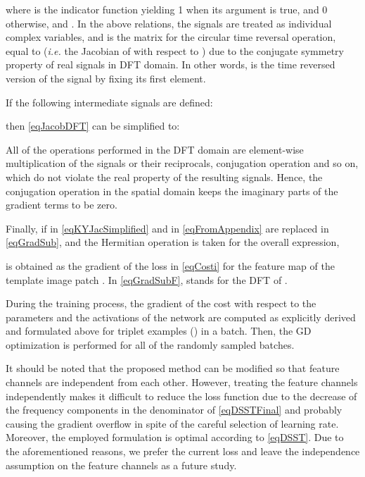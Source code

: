 \documentclass[journal]{IEEEtran}
\begin{document}
\normalsize
where  is the indicator function yielding 1 when its argument is true, and 0 otherwise, and . In the above relations, the signals are treated as individual complex variables, and  is the matrix for the circular time reversal operation, equal to  (\emph{i.e.} the Jacobian of  with respect to ) due to the conjugate symmetry property of real signals in DFT domain. In other words,  is the time reversed version of the signal  by fixing its first element.

If the following intermediate signals are defined:

then \eqref{eqJacobDFT} can be simplified to:


All of the operations performed in the DFT domain are element-wise multiplication of the signals or their reciprocals, conjugation operation and so on, which do not violate the real property of the resulting signals. Hence, the conjugation operation in the spatial domain keeps the imaginary parts of the gradient terms to be zero.

Finally, if  in \eqref{eqKYJacSimplified} and  in \eqref{eqFromAppendix} are replaced in \eqref{eqGradSub}, and the Hermitian operation is taken for the overall expression,

is obtained as the gradient of the loss in \eqref{eqCosti} for the  feature map of the template image patch . In \eqref{eqGradSubF},  stands for the DFT of .

During the training process, the gradient of the cost with respect to the parameters and the activations of the network are computed as explicitly derived and formulated above for  triplet examples () in a batch. Then, the GD optimization is performed for all of the randomly sampled batches. 

It should be noted that the proposed method can be modified so that feature channels are independent from each other. However, treating the feature channels independently makes it difficult to reduce the loss function due to the decrease of the frequency components in the denominator of \eqref{eqDSSTFinal} and probably causing the gradient overflow in spite of the careful selection of learning rate. Moreover, the employed formulation is optimal according to \eqref{eqDSST}. Due to the aforementioned reasons, we prefer the current loss and leave the independence assumption on the feature channels as a future study.
\end{document}
